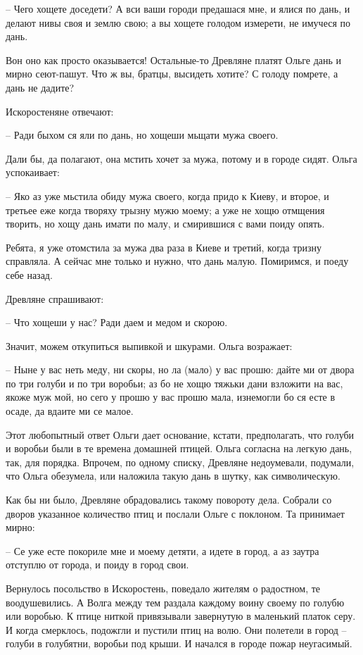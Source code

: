    – Чего хощете доседети? А вси ваши городи предашася мне, и ялися по дань, и делают нивы своя и землю свою; а вы хощете голодом измерети, не имучеся по дань.

Вон оно как просто оказывается! Остальные-то Древляне платят Ольге дань и мирно сеют-пашут. Что ж вы, братцы, высидеть хотите? С голоду помрете, а дань не дадите?

Искоростеняне отвечают:

   – Ради быхом ся яли по дань, но хощеши мьщати мужа своего.

Дали бы, да полагают, она мстить хочет за мужа, потому и в городе сидят. Ольга успокаивает:

   – Яко аз уже мьстила обиду мужа своего, когда придо к Киеву, и второе, и третьее еже когда творяху трызну мужю моему; а уже не хощю отмщения творить, но хощу дань имати по малу, и смирившися с вами поиду опять.

Ребята, я уже отомстила за мужа два раза в Киеве и третий, когда тризну справляла. А сейчас мне только и нужно, что дань малую. Помиримся, и поеду себе назад.
 
Древляне спрашивают:

   – Что хощеши у нас? Ради даем и медом и скорою.

Значит, можем откупиться выпивкой и шкурами. Ольга возражает:

   – Ныне у вас неть меду, ни скоры, но ла (мало) у вас прошю: дайте ми от двора по три голуби и по три воробьи; аз бо не хощю тяжьки дани взложити на вас, якоже муж мой, но сего у прошю у вас прошю мала, изнемогли бо ся есте в осаде, да вдаите ми се малое.

Этот любопытный ответ Ольги дает основание, кстати, предполагать, что голуби и воробьи были в те времена домашней птицей. Ольга согласна на легкую дань, так, для порядка. Впрочем, по одному списку, Древляне недоумевали, подумали, что Ольга  обезумела, или наложила такую дань в шутку, как символическую.

Как бы ни было, Древляне обрадовались такому повороту дела. Собрали со дворов указанное количество птиц и послали Ольге с поклоном. Та принимает мирно:

   – Се уже есте покориле мне и моему детяти, а идете в город, а аз заутра отступлю от города, и поиду в город свои.

Вернулось посольство в Искоростень, поведало жителям о радостном, те воодушевились. А Волга между тем раздала каждому воину своему по голубю или воробью. К птице ниткой привязывали завернутую в маленький платок серу. И когда смерклось, подожгли и пустили птиц на волю. Они полетели в город – голуби в голубятни, воробьи под крыши. И начался в городе пожар неугасимый.

